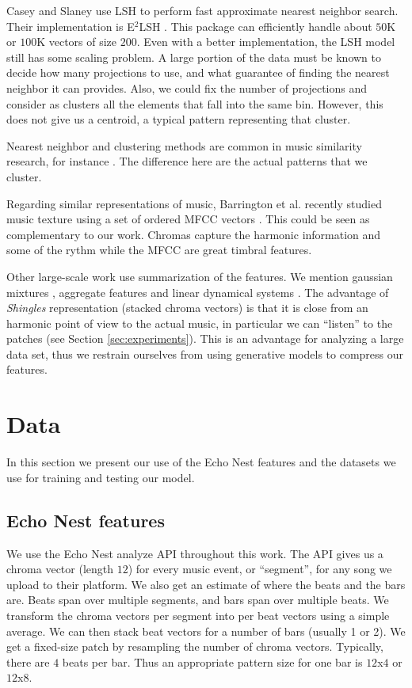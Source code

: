 \documentclass{article}
\begin{document}
Casey and Slaney \cite{Casey2006} use LSH \cite{Datar2004} to perform
fast approximate nearest neighbor search. Their implementation is E$^2$LSH
\cite{E2LSH}. This package can efficiently handle about $50$K or $100$K
vectors of size $200$. Even with a better implementation, the LSH
model still has some scaling problem. A large portion of the data
must be known to decide how many projections to use, and what guarantee
of finding the nearest neighbor it can provides. Also, we could fix the
number of projections and consider as clusters all the elements that
fall into the same bin. However, this does not give us a centroid, a
typical pattern representing that cluster.

Nearest neighbor and clustering methods are common in music similarity 
research, for instance \cite{Cano2004,Holzapfel2009}. The difference here 
are the actual patterns that we cluster.

Regarding similar representations of music,
Barrington et al. recently studied music texture using a set of ordered
MFCC vectors \cite{Barrington2009a}. This could be seen as complementary
to our work. Chromas capture the harmonic information and some of the
rythm while the MFCC are great timbral features.

Other large-scale work use summarization of the features. We mention 
gaussian mixtures \cite{Mandel2005}, 
aggregate features \cite{Bertin-Mahieux2008}
and linear dynamical systems \cite{Barrington2009a}. 
The advantage of \textit{Shingles} representation (stacked chroma vectors)
is that it is close from an harmonic point of view to the actual music, 
in particular
we can ``listen'' to the patches (see Section \ref{sec:experiments}).
This is an advantage for analyzing a large data set, thus
we restrain ourselves from using generative models to compress our features.


\section{Data}\label{sec:data}
In this section we present our use of the Echo Nest features and the
datasets we use for training and testing our model.


\subsection{Echo Nest features}
We use the Echo Nest analyze API \cite{EchoNest} throughout this work.
The API gives us a chroma vector (length $12$) for every music event, 
or ``segment'', for any song we upload to their platform. 
We also get an estimate of where the beats and the bars are. Beats span over
multiple segments, and bars span over multiple beats. 
We transform the chroma vectors per segment into per beat vectors using a 
simple average. We can then stack beat vectors for a number of bars 
(usually 1 or 2). 
We get a fixed-size patch by resampling the number of chroma vectors. Typically,
there are $4$ beats per bar. Thus an appropriate pattern size for one bar
is $12$x$4$ or $12$x$8$.
\end{document}
